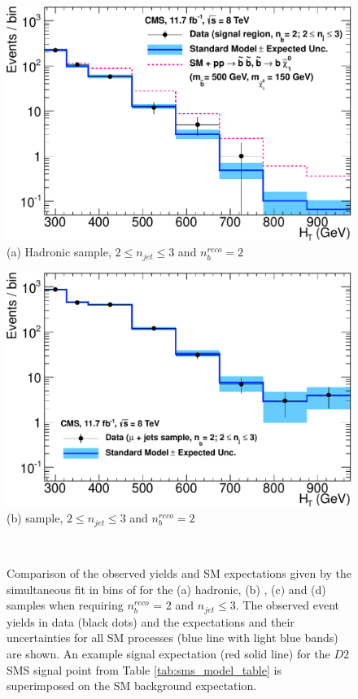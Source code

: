 \begin{figure}[ht]
\footnotesize
\centering
\begin{minipage}[b]{0.48 \linewidth}
\includegraphics[width = 1.0\linewidth]{plots/hadronic_2b_le3j_logy.pdf}
\centering (a)  Hadronic sample, $2 \leq n_{jet} \leq 3$ and $n_{b}^{reco} = 2$ 
\end{minipage}
\quad
\begin{minipage}[b]{0.48\linewidth}
\includegraphics[width = 1.0\linewidth]{plots/muon_2b_le3j_logy.pdf}
\centering (b)  \mupjets sample, $2 \leq n_{jet} \leq 3$ and $n_{b}^{reco} = 2$  
\end{minipage} \\
\caption[Comparison of the observed yields and \ac{SM} expectations given by the simultaneous fit in bins of \theht for the (a) hadronic, (b) \mupjets, (c$)$ \dimupjets and (d) \gpjets samples when requiring $n_{b}^{reco}$ = 2 and $n_{jet} \leq 3$.]{Comparison of the observed yields and \ac{SM} expectations given by the simultaneous fit in bins of \theht for the (a) hadronic, (b) \mupjets, (c$)$ \dimupjets and (d) \gpjets samples when requiring $n_{b}^{reco}$ = 2 and $n_{jet} \leq 3$. The observed event yields in data (black dots) and the expectations and their uncertainties for all SM processes (blue line with light blue bands) are shown. An example signal expectation (red solid line) for the $D2$ \ac{SMS} signal point from Table \ref{tab:sms_model_table} is superimposed on the \ac{SM} background expectation.}
\label{fig:result2blow}
\end{figure}

